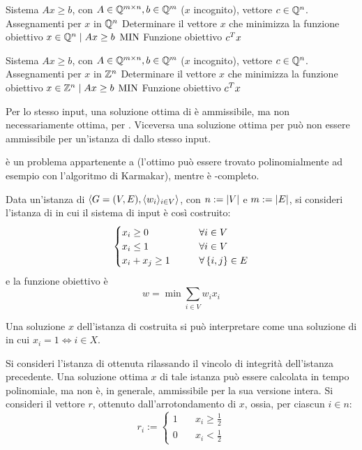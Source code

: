\popt{\LinearProgramming}
{Sistema $Ax\geq b$, con $A\in\mathbb Q^{m\times n},b\in\mathbb Q^m$ ($x$ incognito), vettore $c\in\mathbb Q^n$.}
{Assegnamenti per $x$ in $\mathbb Q^n$}
{Determinare il vettore $x$ che minimizza la funzione obiettivo}
{$x\in\mathbb Q^n\mid Ax\geq b$}
{$\mathrm{MIN}$}
{Funzione obiettivo $c^T x$}

\popt{\IntegerLinearProgramming}
{Sistema $Ax\geq b$, con $A\in\mathbb Q^{m\times n},b\in\mathbb Q^m$ ($x$ incognito), vettore $c\in\mathbb Q^n$.}
{Assegnamenti per $x$ in $\mathbb Z^n$}
{Determinare il vettore $x$ che minimizza la funzione obiettivo}
{$x\in\mathbb Z^n\mid Ax\geq b$}
{$\mathrm{MIN}$}
{Funzione obiettivo $c^T x$}

Per lo stesso input, una soluzione ottima di \IntegerLinearProgramming è ammissibile, ma non necessariamente ottima, per \LinearProgramming.
Viceversa una soluzione ottima per \LinearProgramming può non essere ammissibile per un'istanza di \IntegerLinearProgramming dallo stesso input.

\LinearProgramming è un problema appartenente a \PO (l'ottimo può essere trovato polinomialmente ad esempio con l'algoritmo di Karmakar), mentre \IntegerLinearProgramming è \NPO-completo.

Data un'istanza di \VertexCover $\langle G=(V,E),\langle w_i \rangle_{i\in V} \rangle$, con $n:=| V |$ e $m:=| E |$, si consideri l'istanza di \IntegerLinearProgramming in cui il sistema di input è così costruito:
\begin{equation*}
	\begin{cases}
		x_i\geq 0     & \qquad \forall i\in V         \\
		x_i\leq 1     & \qquad \forall i\in V         \\
		x_i+x_j\geq 1 & \qquad \forall \left\{ i,j \right\}\in E \\
	\end{cases}
\end{equation*}
e la funzione obiettivo è
\begin{equation*}
	w = \min\sum_{i\in V} w_i x_i
\end{equation*}

Una soluzione $x$ dell'istanza di \IntegerLinearProgramming costruita si può interpretare come una soluzione di \VertexCover in cui $x_i=1\iff i\in X$.

Si consideri l'istanza di \LinearProgramming ottenuta rilassando il vincolo di integrità dell'istanza precedente.
Una soluzione ottima $x$ di tale istanza può essere calcolata in tempo polinomiale, ma non è, in generale, ammissibile per la sua versione intera.
Si consideri il vettore $r$, ottenuto dall'arrotondamento di $x$, ossia, per ciascun $i\in n$:
\begin{equation*}
	r_i:= \begin{cases}
		1 & \quad x_i\geq\frac{1}{2} \\
		0 & \quad x_i<\frac{1}{2}
	\end{cases}
\end{equation*}

